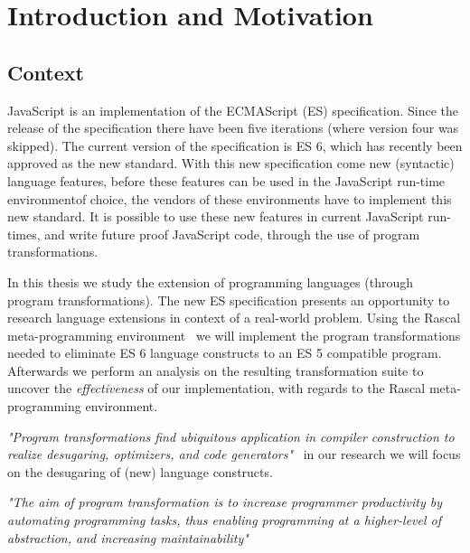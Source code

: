 
\chapter{Introduction and Motivation}

\label{Chapter1}


\section{Context}
JavaScript is an implementation of the ECMAScript (ES) specification. Since the release of the  specification there have been five iterations (where version four was skipped). The current version of the specification is ES 6, which has recently been approved as the new standard. With this new specification come new (syntactic) language features, before these features can be used in the JavaScript run-time environment\footnotemark of choice, the vendors of these environments have to implement this new standard. It is possible to use these new features in current JavaScript run-times, and write future proof JavaScript code, through the use of program transformations.

In this thesis we study the extension of programming languages (through program transformations). The new ES specification presents an opportunity to research language extensions in context of a real-world problem. Using the Rascal meta-programming environment~\cite{Klinta} we will implement the program transformations needed to eliminate ES 6 language constructs to an ES 5 compatible program. Afterwards we perform an analysis on the resulting transformation suite to uncover the \emph{effectiveness} of our implementation, with regards to the Rascal meta-programming environment.

\textit{"Program transformations find ubiquitous application in compiler construction to realize desugaring, optimizers, and code generators"}~\cite{Erdweg2014} 
in our research we will focus on the desugaring of (new) language constructs.  

\textit{"The aim of program transformation is to increase programmer productivity by automating programming tasks, thus enabling programming at a higher-level of abstraction, and increasing maintainability"}~\cite{Visser2001}

